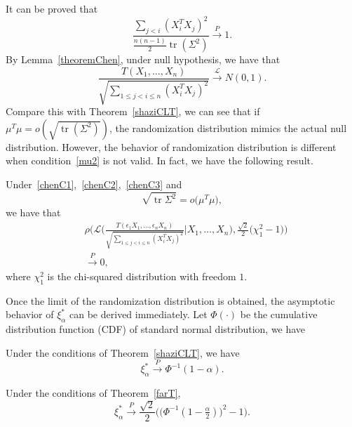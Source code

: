 \documentclass[smallcondensed,final,natbib]{svjour3}          %
\DeclareMathOperator{\mytr}{tr}
\begin{document}
It can be proved that 
\begin{equation*}
\frac{\sum_{j<i}(X_i^T X_j)^2}{\frac{n(n-1)}{2}\mytr (\Sigma^2)}\xrightarrow{P}1.
\end{equation*}
By Lemma~\ref{theoremChen},  under null hypothesis, we have that
\begin{equation*}
\frac{T(X_1,\ldots, X_n)}{\sqrt{\sum_{1\leq j<i\leq n}{(X_i^T X_j)}^2}}\xrightarrow{\mathcal{L}}N(0,1).
\end{equation*}
Compare this with Theorem~\ref{shaziCLT}, we can see that if $\mu^T \mu=o(\sqrt{\mytr (\Sigma^2)})$,  the randomization distribution mimics the actual null distribution.
However, the behavior of randomization distribution is different when condition~\eqref{mu2} is not valid.
In fact, we have the following result.
\begin{theorem}\label{farT}
    Under~\eqref{chenC1},~\eqref{chenC2},~\eqref{chenC3} and
    \begin{equation}\label{mu3}
       \sqrt{\mytr {\Sigma}^2} =o\big(\mu^T\mu\big),
    \end{equation}
    we have that
    \begin{equation*}
        \begin{aligned}
            &\rho\bigg(\mathcal{L}\bigg(\frac{T(\epsilon_1 X_1,\ldots,\epsilon_n X_n)}{\sqrt{\sum_{1\leq j<i\leq n}{(X_i^T X_j)}^2}}\bigg|X_1,\ldots,X_n\bigg),\frac{\sqrt{2}}{2}\big(\chi^2_1-1\big)\bigg)
            \\&\xrightarrow{P} 0,
        \end{aligned}
    \end{equation*}
            where $\chi^2_1$ is the chi-squared distribution with freedom $1$.
\end{theorem}

Once the limit of the randomization distribution is obtained, the asymptotic behavior of $\xi_{\alpha}^*$ can be derived immediately.
Let $\Phi(\cdot)$ be the cumulative distribution function (CDF) of standard normal distribution, we have
\begin{corollary}\label{corollaryQuan}
    Under the conditions of Theorem~\ref{shaziCLT}, we have
    \begin{equation*}
    \xi_{\alpha}^*\xrightarrow{P} \Phi^{-1}(1-\alpha).
    \end{equation*}
\end{corollary}

\begin{corollary}\label{corollaryQuan2}
    Under the conditions of Theorem~\ref{farT},
    \begin{equation*}
    \xi_{\alpha}^*\xrightarrow{P}\frac{\sqrt{2}}{2}\Big(\big(\Phi^{-1}(1-\tfrac{\alpha}{2})\big)^2-1\Big).
    \end{equation*}
\end{corollary}
\end{document}
